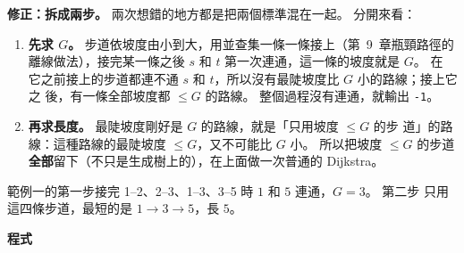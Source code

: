 \textbf{修正：拆成兩步。} 兩次想錯的地方都是把兩個標準混在一起。 分開來看：

\begin{enumerate}
\item \textbf{先求 $G$。} 步道依坡度由小到大，用並查集一條一條接上（第~9~章瓶頸路徑的離線做法），接完某一條之後 $s$ 和 $t$ 第一次連通，這一條的坡度就是 $G$。 在
它之前接上的步道都連不通 $s$ 和 $t$，所以沒有最陡坡度比 $G$ 小的路線；接上它之
後，有一條全部坡度都 $\le G$ 的路線。 整個過程沒有連通，就輸出 \texttt{-1}。
\item \textbf{再求長度。} 最陡坡度剛好是 $G$ 的路線，就是「只用坡度 $\le G$ 的步
道」的路線：這種路線的最陡坡度 $\le G$，又不可能比 $G$ 小。 所以把坡度 $\le G$
的步道\textbf{全部}留下（不只是生成樹上的），在上面做一次普通的 Dijkstra。
\end{enumerate}

範例一的第一步接完 1--2、2--3、1--3、3--5 時 $1$ 和 $5$ 連通，$G = 3$。 第二步
只用這四條步道，最短的是 $1 \to 3 \to 5$，長 $5$。

\textbf{程式}

